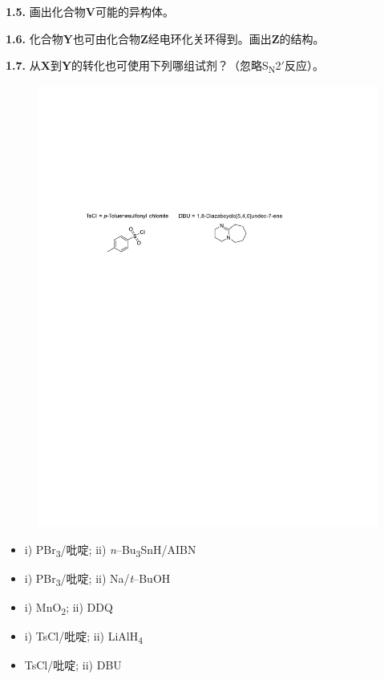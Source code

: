 \noindent\textbf{1.5.} 画出化合物\textbf{V}可能的异构体。

\noindent\textbf{1.6.} 化合物\textbf{Y}也可由化合物\textbf{Z}经电环化关环得到。画出\textbf{Z}的结构。

\noindent\textbf{1.7.} 从\textbf{X}到\textbf{Y}的转化也可使用下列哪组试剂？（忽略S\textsubscript{N}2$'$反应）。

\begin{figure}[h]
	\centering
	\includegraphics[width=12cm]{./pic/t1-5.pdf}
\end{figure}

\renewcommand{\labelitemi}{$\square$}
\begin{itemize}
	\item i) PBr\textsubscript{3}/吡啶; ii)  \textit{n}--Bu\textsubscript{3}SnH/AIBN
	\item i) PBr\textsubscript{3}/吡啶; ii) Na/\emph{t}--BuOH
	\item i) MnO\textsubscript{2}; ii) DDQ
	\item i) TsCl/吡啶; ii) LiAlH\textsubscript{4}
	\item TsCl/吡啶; ii) DBU
\end{itemize}
\renewcommand{\labelitemi}{$\bullet$}

